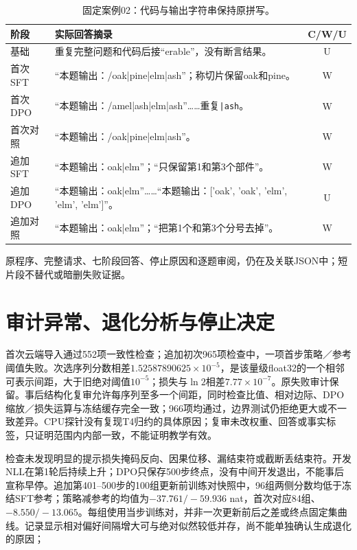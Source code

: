 \begin{table}[H]\centering\small
\caption{固定案例02：代码与输出字符串保持原拼写。}\label{tab:training-case02}
\begin{tabularx}{\linewidth}{@{}lYc@{}}\toprule
阶段 & 实际回答摘录 & C/W/U\\\midrule
基础 & 重复完整问题和代码后接“erable”，没有断言结果。 & U\\
首次SFT & “本题输出：/oak|pine|elm|ash”；称切片保留oak和pine。 & W\\
首次DPO & “本题输出：/amel|ash|elm|ash”……重复\texttt{|ash}。 & W\\
首次对照 & “本题输出：/oak|pine|elm|ash”。 & W\\
追加SFT & “本题输出：oak|elm”；“只保留第1和第3个部件”。 & W\\
追加DPO & “本题输出：oak|elm”……“本题输出：['oak', 'oak', 'elm', 'elm', 'elm']”。 & U\\
追加对照 & “本题输出：oak|elm”；“把第1个和第3个分号去掉”。 & W\\\bottomrule
\end{tabularx}
\end{table}\FloatBarrier

原程序、完整请求、七阶段回答、停止原因和逐题审阅，仍在及关联JSON中；短片段不替代或暗删失败证据。

\section{审计异常、退化分析与停止决定}
首次云端导入通过552项一致性检查；追加初次965项检查中，一项首步策略／参考阈值失败。次选序列分数相差$1.52587890625\times10^{-5}$，是该量级float32的一个相邻可表示间距，大于旧绝对阈值$10^{-5}$；损失与$\ln2$相差$7.77\times10^{-7}$。原失败审计保留。事后结构化复审允许每序列至多一个间距，同时检查比值、相对边际、DPO缩放／损失运算与冻结缓存完全一致；966项均通过，边界测试仍拒绝更大或不一致差异。CPU探针没有复现T4归约的具体原因；复审未改权重、回答或事实标签，只证明范围内内部一致，不能证明教学有效。

检查未发现明显的提示损失掩码反向、因果位移、漏结束符或截断丢结束符。开发NLL在第1轮后持续上升；DPO只保存500步终点，没有中间开发退出，不能事后宣称早停。追加第401--500步的100组更新前训练对快照中，96组两侧分数均低于冻结SFT参考；策略减参考的均值为$-37.761/-59.936$ nat，首次对应84组、$-8.550/-13.065$。每组使用当步训练对，并非一次更新前后之差或终点固定集曲线。记录显示相对偏好间隔增大可与绝对似然较低并存，尚不能单独确认生成退化的原因；

